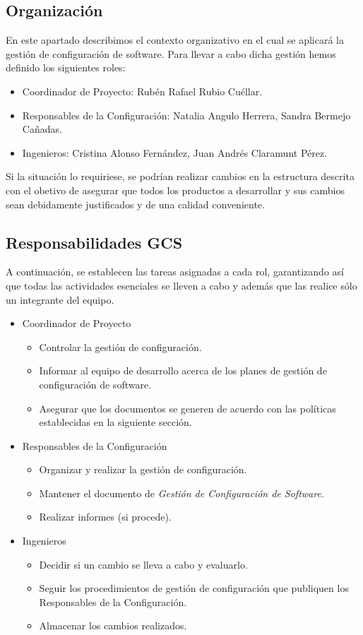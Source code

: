 \documentclass[11pt, a4paper, twoside, titlepage]{article}
\begin{document}
		\subsection{Organización}
			En este apartado describimos el contexto organizativo en el cual se aplicará la gestión de configuración de software. Para llevar a cabo dicha gestión hemos definido los siguientes roles:

			\begin{itemize}
				\item Coordinador de Proyecto: Rubén Rafael Rubio Cuéllar.
				\item Responsables de la Configuración: Natalia Angulo Herrera, Sandra Bermejo Cañadas.
				\item Ingenieros: Cristina Alonso Fernández, Juan Andrés Claramunt Pérez.
			\end{itemize}

			Si la situación lo requiriese, se podrían realizar cambios en la estructura descrita con el obetivo de asegurar que todos los productos a desarrollar y sus cambios sean debidamente justificados y de una calidad conveniente.
		\subsection{Responsabilidades GCS}
			A continuación, se establecen las tareas asignadas a cada rol, garantizando así que todas las actividades esenciales se lleven a cabo y además que las realice sólo un integrante del equipo.
			\begin{itemize}
				\item Coordinador de Proyecto
					\begin{itemize}
						\item Controlar la gestión de configuración.
						\item Informar al equipo de desarrollo acerca de los planes de gestión de configuración de software.
						\item Asegurar que los documentos se generen de acuerdo con las políticas establecidas en la siguiente sección.
					\end{itemize}
				\item Responsables de la Configuración
					\begin{itemize}
						\item Organizar y realizar la gestión de configuración.
						\item Mantener el documento de \textit{Gestión de Configuración de Software}.
						\item Realizar informes (si procede).
					\end{itemize}
				\item Ingenieros
					\begin{itemize}
						\item Decidir si un cambio se lleva a cabo y evaluarlo.
						\item Seguir los procedimientos de gestión de configuración que publiquen los Responsables de la Configuración.
						\item Almacenar los cambios realizados.
					\end{itemize}
			\end{itemize}
\end{document}
